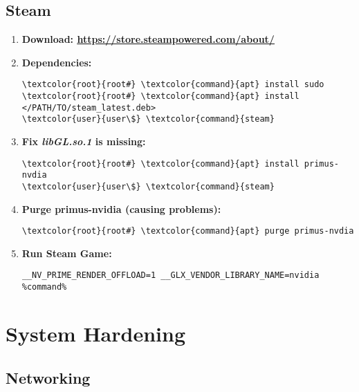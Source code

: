 \documentclass[10pt, a4paper, onecolumn, openany]{book} %
\begin{document}
\section{Steam}
\begin{enumerate}
    \item \textbf{Download: \underline{\url{https://store.steampowered.com/about/}}}
    \item \textbf{Dependencies:}
\begin{Verbatim}[commandchars=\\\{\}]
\textcolor{root}{root#} \textcolor{command}{apt} install sudo
\textcolor{root}{root#} \textcolor{command}{apt} install </PATH/TO/steam_latest.deb>
\textcolor{user}{user\$} \textcolor{command}{steam}
\end{Verbatim}
    \item \textbf{Fix \textit{libGL.so.1} is missing:}
\begin{Verbatim}[commandchars=\\\{\}]
\textcolor{root}{root#} \textcolor{command}{apt} install primus-nvdia
\textcolor{user}{user\$} \textcolor{command}{steam}
\end{Verbatim}
    \item \textbf{Purge primus-nvidia (causing problems):}
\begin{Verbatim}[commandchars=\\\{\}]
\textcolor{root}{root#} \textcolor{command}{apt} purge primus-nvdia
\end{Verbatim}
    \item \textbf{Run Steam Game:}
\begin{verbatim}
__NV_PRIME_RENDER_OFFLOAD=1 __GLX_VENDOR_LIBRARY_NAME=nvidia %command%
\end{verbatim}
\end{enumerate}
\chapter{System Hardening}
\section{Networking}
\end{document}
